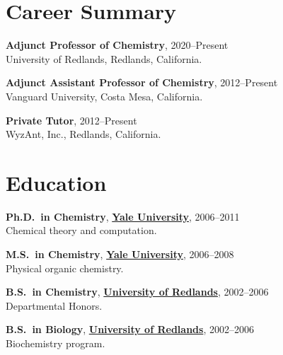 \documentclass[11pt]{article}
\newcommand{\eduitem}[4]{\textbf{#1}, \textbf{#2}, #3\\#4}
\newcommand{\careeritem}[4]{\textbf{#1}, #2\\#3, #4}
\begin{document}

\section{Career Summary}

\careeritem{Adjunct Professor of Chemistry}{2020--Present}
{University of Redlands}{Redlands, California.}

\careeritem{Adjunct Assistant Professor of Chemistry}{2012--Present}
{Vanguard University}{Costa Mesa, California.}

\careeritem{Private Tutor}{2012--Present}
{WyzAnt, Inc.}{Redlands, California.}


\section{Education}


\eduitem{Ph.D.\ in Chemistry}{\href{http://www.yale.edu/}{Yale University}}{2006--2011}
{Chemical theory and computation.} 

\eduitem{M.S.\ in Chemistry}{\href{http://www.yale.edu/}{Yale University}}{2006--2008}
{Physical organic chemistry.} 

\eduitem{B.S.\ in Chemistry}{\href{http://www.redlands.edu/}{University of Redlands}}{2002--2006}
{Departmental Honors.} 

\eduitem{B.S.\ in Biology}{\href{http://www.redlands.edu/}{University of Redlands}}{2002--2006}
{Biochemistry program.} 

\end{document}
